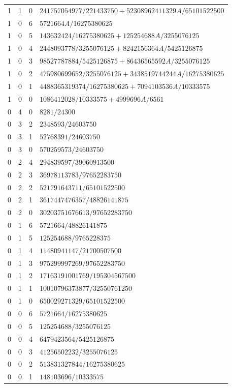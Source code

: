 \begin{longtable}{rrrl}
1 & 1 & 0 & $241757054977/221433750+52308962411329A/65101522500$\\
1 & 0 & 6 & $5721664A/16275380625$\\
1 & 0 & 5 & $143632424/16275380625+125254688A/3255076125$\\
1 & 0 & 4 & $2448093778/3255076125+8242156364A/5425126875$\\
1 & 0 & 3 & $98527787884/5425126875+86436565592A/3255076125$\\
1 & 0 & 2 & $475980699652/3255076125+3438519744244A/16275380625$\\
1 & 0 & 1 & $4488365319374/16275380625+7094103536A/10333575$\\
1 & 0 & 0 & $1086412028/10333575+4999696A/6561$\\
0 & 4 & 0 & $8281/24300$\\
0 & 3 & 2 & $2348593/24603750$\\
0 & 3 & 1 & $52768391/24603750$\\
0 & 3 & 0 & $570259573/24603750$\\
0 & 2 & 4 & $294839597/39060913500$\\
0 & 2 & 3 & $36978113783/97652283750$\\
0 & 2 & 2 & $521791643711/65101522500$\\
0 & 2 & 1 & $3617447476357/48826141875$\\
0 & 2 & 0 & $30203751676613/97652283750$\\
0 & 1 & 6 & $5721664/48826141875$\\
0 & 1 & 5 & $125254688/9765228375$\\
0 & 1 & 4 & $11480941147/21700507500$\\
0 & 1 & 3 & $975299997269/97652283750$\\
0 & 1 & 2 & $17163191001769/195304567500$\\
0 & 1 & 1 & $10010796373877/32550761250$\\
0 & 1 & 0 & $650029271329/65101522500$\\
0 & 0 & 6 & $5721664/16275380625$\\
0 & 0 & 5 & $125254688/3255076125$\\
0 & 0 & 4 & $6479423564/5425126875$\\
0 & 0 & 3 & $41256502232/3255076125$\\
0 & 0 & 2 & $513831327844/16275380625$\\
0 & 0 & 1 & $148103696/10333575$\\
\bottomrule
\end{longtable}
